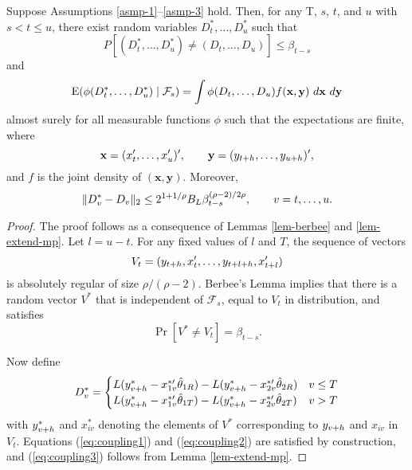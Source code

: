 \documentclass[12pt]{article}
\begin{document}
\begin{lem}\label{lem-basic-coupling}
  Suppose Assumptions \ref{asmp-1}--\ref{asmp-3} hold.  Then, for any
  T, $s$, $t$, and $u$ with $s < t \leq u$, there exist random
  variables $D_t^*,\dots,D_u^*$ such that
  \begin{equation}\label{eq:coupling1}
    P[(D_{t}^*,\dots,D_u^*) \neq (D_{t},\dots,D_u)] \leq \beta_{t-s}
  \end{equation}
  and
  \begin{equation}\label{eq:coupling2}
    \E(\phi(D_{t}^*,\dots, D_u^*) \mid \mathcal{F}_s ) =
    \int
    \phi(D_{t},\dots,D_u) f(\mathbf{x}, \mathbf{y})\ d\mathbf{x}\ d\mathbf{y}
  \end{equation}
  almost surely for all measurable functions $\phi$ such that the
  expectations are finite, where
  \[ \mathbf{x} = (x_{t}', \dots, x_{u}')', \qquad
  \mathbf{y} = (y_{t+h},\dots,y_{u+h})',\] and $f$ is the
  joint density of $(\mathbf{x}, \mathbf{y})$.  Moreover,
 \begin{equation}\label{eq:coupling3}
   \| D_v^* - D_v \|_2 \leq 2^{1+1/\rho} B_L
   \beta_{t-s}^{(\rho-2)/2\rho}, \qquad v = t,\dots,u.
 \end{equation}
\end{lem}

\begin{proof}
  The proof follows as a consequence of Lemmas \ref{lem-berbee} and
  \ref{lem-extend-mp}.  Let $l = u-t$.  For any fixed values of $l$
  and $T$, the sequence of vectors
  \[ V_{t} = (y_{t+h}, x_{t}', \dots, y_{t+l+h}, x_{t+l}') \] is
  absolutely regular of size $\rho/(\rho-2)$.  Berbee's Lemma implies
  that there is a random vector $V^*$ that is independent of
  $\mathcal{F}_s$, equal to $V_{t}$ in distribution, and satisfies
  \[\Pr[V^* \neq V_{t}] = \beta_{t-s}.\]

  Now define
  \begin{equation*}
    D_v^* =
    \begin{cases}
      L(y_{v+h}^* - x_{1v}^{*\prime} \hat{\theta}_{1R}) - L(y_{v+h}^* -
      x_{2v}^{*\prime} \hat{\theta}_{2R}) & v \leq T \\
      L(y_{v+h}^* - x_{1v}^{*\prime} \hat{\theta}_{1T}) - L(y_{v+h}^* -
      x_{2v}^{*\prime} \hat{\theta}_{2T}) & v > T
    \end{cases}
  \end{equation*}
  with $y_{v+h}^*$ and $x_{iv}^*$ denoting the elements of $V^*$
  corresponding to $y_{v+h}$ and $x_{iv}$ in $V_{t}$.  Equations
  (\ref{eq:coupling1}) and (\ref{eq:coupling2}) are satisfied by
  construction, and (\ref{eq:coupling3}) follows from Lemma
  \ref{lem-extend-mp}.
\end{proof}
\end{document}
